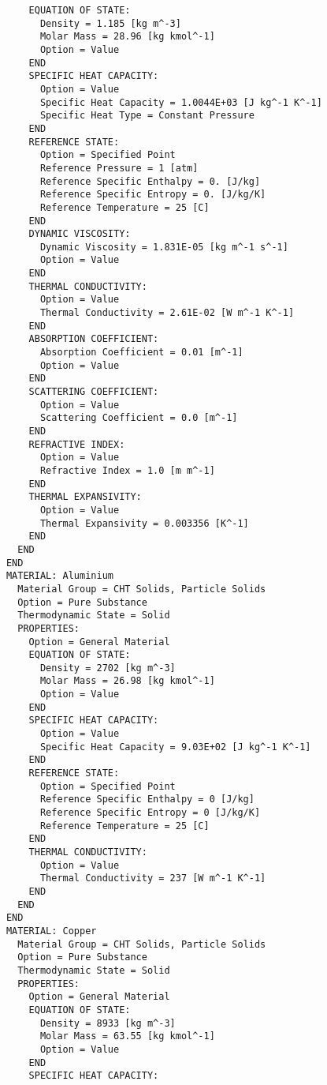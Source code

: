 \begin{verbatim}
          EQUATION OF STATE:
            Density = 1.185 [kg m^-3]
            Molar Mass = 28.96 [kg kmol^-1]
            Option = Value
          END
          SPECIFIC HEAT CAPACITY:
            Option = Value
            Specific Heat Capacity = 1.0044E+03 [J kg^-1 K^-1]
            Specific Heat Type = Constant Pressure
          END
          REFERENCE STATE:
            Option = Specified Point
            Reference Pressure = 1 [atm]
            Reference Specific Enthalpy = 0. [J/kg]
            Reference Specific Entropy = 0. [J/kg/K]
            Reference Temperature = 25 [C]
          END
          DYNAMIC VISCOSITY:
            Dynamic Viscosity = 1.831E-05 [kg m^-1 s^-1]
            Option = Value
          END
          THERMAL CONDUCTIVITY:
            Option = Value
            Thermal Conductivity = 2.61E-02 [W m^-1 K^-1]
          END
          ABSORPTION COEFFICIENT:
            Absorption Coefficient = 0.01 [m^-1]
            Option = Value
          END
          SCATTERING COEFFICIENT:
            Option = Value
            Scattering Coefficient = 0.0 [m^-1]
          END
          REFRACTIVE INDEX:
            Option = Value
            Refractive Index = 1.0 [m m^-1]
          END
          THERMAL EXPANSIVITY:
            Option = Value
            Thermal Expansivity = 0.003356 [K^-1]
          END
        END
      END
      MATERIAL: Aluminium
        Material Group = CHT Solids, Particle Solids
        Option = Pure Substance
        Thermodynamic State = Solid
        PROPERTIES:
          Option = General Material
          EQUATION OF STATE:
            Density = 2702 [kg m^-3]
            Molar Mass = 26.98 [kg kmol^-1]
            Option = Value
          END
          SPECIFIC HEAT CAPACITY:
            Option = Value
            Specific Heat Capacity = 9.03E+02 [J kg^-1 K^-1]
          END
          REFERENCE STATE:
            Option = Specified Point
            Reference Specific Enthalpy = 0 [J/kg]
            Reference Specific Entropy = 0 [J/kg/K]
            Reference Temperature = 25 [C]
          END
          THERMAL CONDUCTIVITY:
            Option = Value
            Thermal Conductivity = 237 [W m^-1 K^-1]
          END
        END
      END
      MATERIAL: Copper
        Material Group = CHT Solids, Particle Solids
        Option = Pure Substance
        Thermodynamic State = Solid
        PROPERTIES:
          Option = General Material
          EQUATION OF STATE:
            Density = 8933 [kg m^-3]
            Molar Mass = 63.55 [kg kmol^-1]
            Option = Value
          END
          SPECIFIC HEAT CAPACITY:

\end{verbatim}
